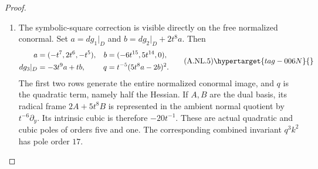 \begin{proof}
\begin{enumerate}[label={$\langle1\rangle$\arabic*.},leftmargin=*]
\item The symbolic-square correction is visible directly on the free
normalized conormal. Set $a=dg_1|_D$ and
$b=dg_2|_D+2t^8a$. Then
\[
 \begin{aligned}
 a&=(-t^7,2t^6,-t^5),& b&=(-6t^{15},5t^{14},0),\\
 dg_3|_D&=-3t^9a+tb,&
 q&=t^{-5}(5t^8a-2b)^2.
 \end{aligned}                                                   \tag{A.NL.5}\hypertarget{tag-006N}{}\label{cdp:eq:A.NL.5}
\]
The first two rows generate the entire normalized conormal image,
and $q$ is the quadratic term, namely half the Hessian.
If $A,B$ are the dual basis, its radical frame $2A+5t^8B$
is represented in the ambient normal quotient by $t^{-6}\partial_y$.
Its intrinsic cubic is therefore $-20t^{-1}$. These are actual
quadratic and cubic poles of orders five and one. The corresponding
combined invariant $q^3k^2$ has pole order $17$.


\end{enumerate}
\end{proof}